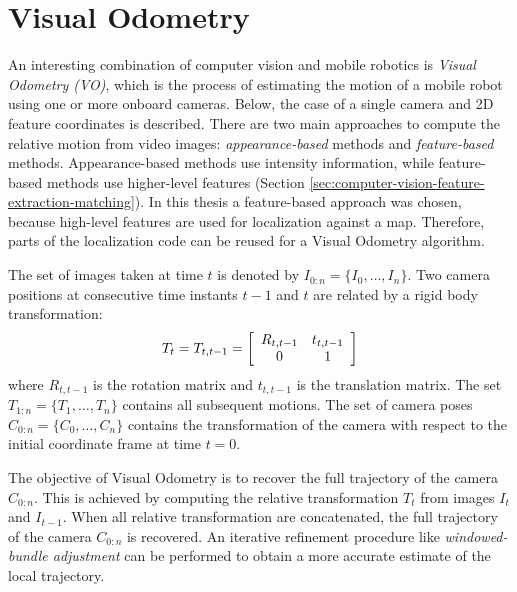 \section{Visual Odometry}
\label{sec:background-visual-odometry}
An interesting combination of computer vision and mobile robotics is \textit{Visual Odometry (VO)}, which is the process of estimating the motion of a mobile robot using one or more onboard cameras.
Below,
the case of a single camera and 2D feature coordinates is described.
There are two main approaches to compute the relative motion from video images: \textit{appearance-based} methods and \textit{feature-based} methods.
Appearance-based methods use intensity information, while feature-based methods use higher-level features (Section \ref{sec:computer-vision-feature-extraction-matching}).
In this thesis a feature-based approach was chosen, because high-level features are used for localization against a map.
Therefore, parts of the localization code can be reused for a Visual Odometry algorithm.

The set of images taken at time $t$ is denoted by $I_{0:n} = \{I_0, \hdots, I_n\}$.
Two camera positions at consecutive time instants $t-1$ and $t$ are related by a rigid body transformation:
\begin{equation}
\label{eq:computer-vision-visual-odometry-T}
T_t = T_{t,t-1} = 
\left[ \begin{array}{c c}
R_{t,t-1} & t_{t,t-1} \\
0 & 1
\end{array} \right]
\end{equation}
where $R_{t,t-1}$ is the rotation matrix and $t_{t,t-1}$ is the translation matrix.
The set $T_{1:n} = \{T_1, \hdots, T_n\}$ contains all subsequent motions.
The set of camera poses $C_{0:n} = \{C_0, \hdots, C_n\}$ contains the transformation of the camera with respect to the initial coordinate frame at time $t = 0$.

The objective of Visual Odometry is to recover the full trajectory of the camera $C_{0:n}$.
This is achieved by computing the relative transformation $T_t$ from images $I_t$ and $I_{t-1}$.
When all relative transformation are concatenated, the full trajectory of the camera $C_{0:n}$ is recovered.
An iterative refinement procedure like \textit{windowed-bundle adjustment} can be performed to obtain a more accurate estimate of the local trajectory.

